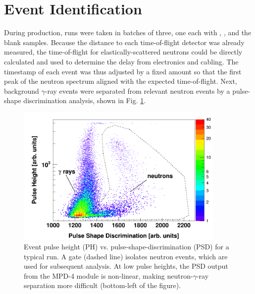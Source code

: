 \section{Event Identification}
During production, runs were taken in batches of three, one each with \snTwelve,
\snFour, and the blank samples. Because the distance to each time-of-flight detector
was already measured, the time-of-flight for elastically-scattered neutrons could
be directly calculated and used to determine the delay from electronics and cabling.
The timestamp of each event was thus adjusted by a fixed amount
so that the first peak of the neutron spectrum aligned with the expected
time-of-flight. Next, background $\gamma$-ray events were separated from relevant
neutron events by a pulse-shape discrimination analysis, shown in Fig. \ref{PHPSDPlot}.

\begin{figure}[tb]
    \centering
    \includegraphics[width=0.9\textwidth]{figures/PHPSDPlot.png}
    \caption[Event pulse height (PH) vs. pulse-shape-discrimination (PSD) for
    a typical run]
    {
        Event pulse height (PH) vs. pulse-shape-discrimination (PSD) for
        a typical run. A gate (dashed line) isolates neutron events, which are
        used for subsequent analysis. At low pulse heights, the PSD output from the
        MPD-4 module is non-linear, making neutron-$\gamma$-ray separation more difficult
        (bottom-left of the figure).
    }
    \label{PHPSDPlot}
\end{figure}

